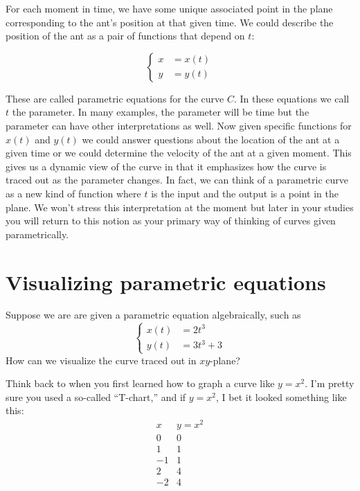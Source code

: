 \documentclass{ximera}
\begin{document}
For each moment in time, we have some unique associated point in the plane corresponding to the ant's position at that given time. We could describe the position of the ant as a pair of functions that depend on $t$:

\[
\begin{cases}
x&=x(t) \\
y&=y(t)
\end{cases}
\]

These are called parametric equations for the curve $C$. In these equations we call $t$ the parameter.  In many examples, the parameter will be time but the parameter can have other interpretations as well. Now given specific functions for $x(t)$ and $y(t)$ we could answer questions about the location of the ant at a given time or we could determine the velocity of the ant at a given moment. This gives us a dynamic view of the curve in that it emphasizes how the curve is traced out as the parameter changes. In fact, we can think of a parametric curve as a new kind of function where $t$ is the input and the output is a point in the plane. We won't stress this interpretation at the moment but later in your studies you will return to this notion as your primary way of thinking of curves given parametrically.
\begin{onlineOnly}
\end{onlineOnly}


\section{Visualizing parametric equations}
Suppose we are are given a parametric equation algebraically, such as
\[
\begin{cases}
x(t)&=2t^3 \\
y(t)&=3t^3+3
\end{cases}
\]
How can we visualize the curve traced out in $xy$-plane?

Think back to when you first learned how to graph a curve like $y=x^2$.  I'm
pretty sure you used a so-called ``T-chart,'' and if $y = x^2$, I bet it
looked something like this:
\[
\begin{array}{c|c}
  x & y = x^2\\\hline
  0 & 0 \\
  1 & 1\\
  -1 & 1\\
  2 & 4\\
  -2 & 4
\end{array}
\]
\end{document}

